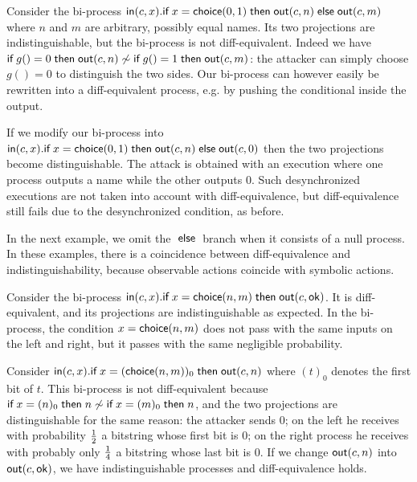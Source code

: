 \begin{example}
  Consider the bi-process
  $\mathsf{in}(c,x).\textsf{if}\; x=\mathsf{choice}(0,1) \;\textsf{then}\; \mathsf{out}(c,n) \;\textsf{else}\; \mathsf{out}(c,m)$
  where $n$ and $m$ are arbitrary, possibly equal names.
  Its two projections are indistinguishable, but the
  bi-process is not diff-equivalent.
  Indeed we have
  $\textsf{if}\; g()=0 \;\textsf{then}\; \mathsf{out}(c,n) \not\sim
   \textsf{if}\; g()=1 \;\textsf{then}\; \mathsf{out}(c,m)$: the attacker can simply choose
  $g()=0$ to distinguish the two sides.
  Our bi-process can however easily be
  rewritten into a diff-equivalent process, e.g. by pushing the conditional
  inside the output.

  If we modify our bi-process into
  $\mathsf{in}(c,x).\textsf{if}\; x=\mathsf{choice}(0,1) \;\textsf{then}\; \mathsf{out}(c,n) \;\textsf{else}\; \mathsf{out}(c,0)$
  then the two projections become distinguishable.
  The attack is obtained with an execution
  where one process outputs a name while the other outputs $0$. Such
  desynchronized executions are not taken into account with diff-equivalence,
  but diff-equivalence still fails due to the desynchronized condition,
  as before.
\end{example}

\newcommand{\ok}{\mathsf{ok}}

In the next example, we omit the $\;\textsf{else}\;$ branch when it consists of a null
process. In these examples, there is a coincidence between diff-equivalence
and indistinguishability, because observable actions coincide with symbolic
actions.

\begin{example} \label{ex:negl}
  Consider the bi-process
  $\In(c,x).\myif x=\diff{n}{m} \mythen \Out(c,\ok)$.
  It is diff-equivalent, and its projections are
  indistinguishable as expected.
  In the bi-process, the condition $x=\mathsf{choice}(n,m)$ does not pass
  with the same inputs on the left and right, but it passes with
  the same negligible probability.
\end{example}

\begin{example} \label{ex:sync}
  Consider
  $\mathsf{in}(c,x).\textsf{if}\; x=(\mathsf{choice}(n,m))_0 \;\textsf{then}\; \mathsf{out}(c,n)$
  where $(t)_0$ denotes the first bit of $t$.
  This bi-process is not diff-equivalent because
  $\textsf{if}\; x=(n)_0 \;\textsf{then}\; n \not\sim \textsf{if}\; x=(m)_0 \;\textsf{then}\; n$, and
  the two projections are distinguishable for the same
  reason: the attacker sends $0$;
  on the left he receives with probability $1\over 2$ a bitstring whose
  first bit is $0$;
  on the right process he receives with probably only $1\over 4$
  a bitstring whose last bit is $0$.
  If we change $\mathsf{out}(c,n)$ into $\Out(c,\ok)$,
  we have indistinguishable processes and diff-equivalence holds.
\end{example}

